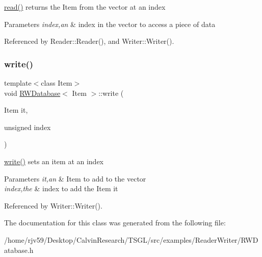 \hyperlink{class_r_w_database_acb53aad02a38e6e021ba61f63b35ba9a}{read()} returns the Item from the vector at an index 


\begin{DoxyParams}{Parameters}
{\em index,an} & index in the vector to access a piece of data \\
\hline
\end{DoxyParams}


Referenced by Reader\+::\+Reader(), and Writer\+::\+Writer().

\mbox{\label{class_r_w_database_acfdb85c4ae5201e9997265c6d44a3111}} 
\subsubsection{\texorpdfstring{write()}{write()}}
{\footnotesize\ttfamily template$<$class Item$>$ \\
void \hyperlink{class_r_w_database}{R\+W\+Database}$<$ Item $>$\+::write (\begin{DoxyParamCaption}\item[{Item}]{it,  }\item[{unsigned}]{index }\end{DoxyParamCaption})}



\hyperlink{class_r_w_database_acfdb85c4ae5201e9997265c6d44a3111}{write()} sets an item at an index 


\begin{DoxyParams}{Parameters}
{\em it,an} & Item to add to the vector \\
\hline
{\em index,the} & index to add the Item it \\
\hline
\end{DoxyParams}


Referenced by Writer\+::\+Writer().



The documentation for this class was generated from the following file\+:\begin{DoxyCompactItemize}
\item 
/home/rjv59/\+Desktop/\+Calvin\+Research/\+T\+S\+G\+L/src/examples/\+Reader\+Writer/R\+W\+Database.\+h\end{DoxyCompactItemize}
